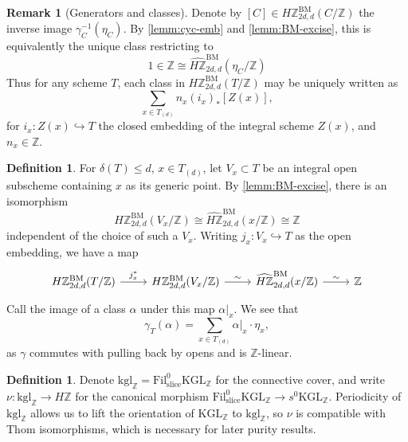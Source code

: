 \documentclass[11pt, twoside]{article}
\numberwithin{equation}{section}
\theoremstyle{definition}
\newtheorem{definition}[equation]{Definition}
\newtheorem{remark}[equation]{Remark}
\newcommand{\bb}[1]{\mathbb{#1}}
\newcommand{\fil}{\mathrm{Fil}}
\newcommand{\Kgl}{\mathrm{KGL}}
\newcommand{\kgl}{\mathrm{kgl}}
\newcommand{\bm}{\mathrm{BM}}
\newcommand{\sli}{\mathrm{slice}}
\begin{document}
\begin{remark}[Generators and classes]
Denote by \([C] \in H\bb{Z}_{2d, d}^\bm(C/\bb{Z})\) the inverse image \(\gamma_C^{- 1}(\eta_C)\). By \ref{lemm:cyc-emb} and \ref{lemm:BM-excise}, this is equivalently the unique class restricting to 
\[1 \in \bb{Z} \cong \hat{H\bb{Z}}_{2d, d}^\bm(\eta_C/\bb{Z})\]
Thus for any scheme \(T\), each class in \(H\bb{Z}_{2d, d}^\bm(T/\bb{Z})\) may be uniquely written as 
\[\sum_{x \in T_{(d)}} n_x (i_x)_* [Z(x)],\]
for \(i_x \colon Z(x) \hookrightarrow T\) the closed embedding of the integral scheme \(Z(x)\), and \(n_x \in \bb{Z}\).
\end{remark}

\begin{definition}\label{def:stalky}
For \(\delta(T) \leq d\), \(x \in T_{(d)}\), let \(V_x \subset T\) be an integral open subscheme containing \(x\) as its generic point. %
By \ref{lemm:BM-excise}, there is an isomorphism 
\[H\bb{Z}_{2d, d}^\bm(V_x/\bb{Z}) \cong \hat{H\bb{Z}}_{2d, d}^\bm(x/\bb{Z}) \cong \bb{Z} \]
independent of the choice of such a \(V_x\). Writing \(j_x \colon V_x \hookrightarrow T\) as the open embedding, we have a map
\[\begin{tikzcd} H\bb{Z}_{2d, d}^\bm(T/\bb{Z}) \ar[r, "j_x^*"] & H\bb{Z}_{2d, d}^\bm(V_x/\bb{Z}) \ar[r, "\sim"] & \hat{H\bb{Z}}_{2d, d}^\bm(x/\bb{Z}) \ar[r, "\sim"] & \bb{Z} \end{tikzcd}\]
Call the image of a class \(\alpha\) under this map \(\alpha|_x\). We see that 
\begin{equation}\label{eq:functionals}
\gamma_T(\alpha) = \sum_{x \in T_{(d)}} \alpha|_x \cdot \eta_x,
\end{equation}
as \(\gamma\) commutes with pulling back by opens and is \(\bb{Z}\)-linear.
\end{definition}

\begin{definition}
Denote \(\kgl_\bb{Z} = \fil_\sli^0 \Kgl_\bb{Z}\) for the connective cover, and write \(\nu \colon \kgl_\bb{Z} \to H\bb{Z}\) for the canonical morphism \(\fil_\sli^0 \Kgl_\bb{Z} \to s^0 \Kgl_\bb{Z}\). %
Periodicity of \(\kgl_\bb{Z}\)  allows us to lift the orientation of \(\Kgl_\bb{Z}\) to \(\kgl_\bb{Z}\), so \(\nu\) is compatible with Thom isomorphisms, which is necessary for later purity results.
\end{definition}
\end{document}
